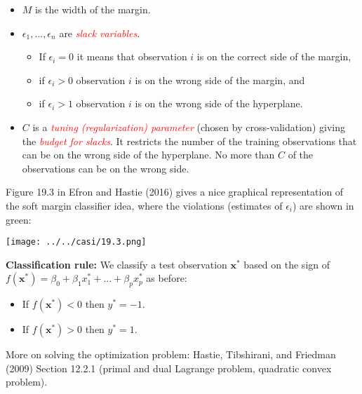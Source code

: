 \documentclass[10pt,ignorenonframetext,]{beamer}
\providecommand{\tightlist}{%
  \setlength{\itemsep}{0pt}\setlength{\parskip}{0pt}}
\begin{document}
\begin{frame}

\begin{itemize}
\item
  \(M\) is the width of the margin.
\item
  \(\epsilon_1,...,\epsilon_n\) are
  \emph{\textcolor{red}{slack variables}}.

  \begin{itemize}
  \tightlist
  \item
    If \(\epsilon_i=0\) it means that observation \(i\) is on the
    correct side of the margin,
  \item
    if \(\epsilon_i>0\) observation \(i\) is on the wrong side of the
    margin, and
  \item
    if \(\epsilon_i>1\) observation \(i\) is on the wrong side of the
    hyperplane.
  \end{itemize}
\item
  \(C\) is a \emph{\textcolor{red}{tuning (regularization) parameter}}
  (chosen by cross-validation) giving the
  \emph{\textcolor{red}{budget for slacks}}. It restricts the number of
  the training observations that can be on the wrong side of the
  hyperplane. No more than \(C\) of the observations can be on the wrong
  side.
\end{itemize}

\end{frame}

\begin{frame}

Figure 19.3 in Efron and Hastie (2016) gives a nice graphical
representation of the soft margin classifier idea, where the violations
(estimates of \(\epsilon_i\)) are shown in green:

\centering

\texttt{[image: ../../casi/19.3.png]}

\end{frame}

\begin{frame}

\textbf{Classification rule:} We classify a test observation
\({\boldsymbol x}^*\) based on the sign of
\(f({\boldsymbol x}^*)=\beta_0+\beta_1 x_1^*+...+\beta_p x_p^*\) as
before:

\begin{itemize}
\tightlist
\item
  If \(f({\boldsymbol x}^*)<0\) then \(y^*=-1\).
\item
  If \(f({\boldsymbol x}^*)>0\) then \(y^*=1\).
\end{itemize}

More on solving the optimization problem: Hastie, Tibshirani, and
Friedman (2009) Section 12.2.1 (primal and dual Lagrange problem,
quadratic convex problem).

\end{frame}
\end{document}
